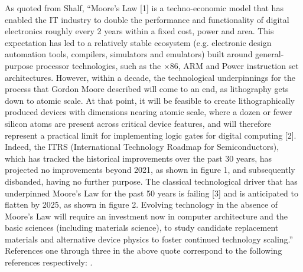\documentclass[]{article}
\begin{document}

As quoted from Shalf\cite{shalf2020future},
``Moore’s Law [1] is a techno-economic model that has enabled the IT industry to double the performance and functionality of digital electronics roughly every 2 years within a fixed cost, power and area. This expectation has led to a relatively stable ecosystem (e.g. electronic design automation tools, compilers, simulators and emulators) built around general-purpose processor technologies, such as the ×86, ARM and Power instruction set architectures. However, within a decade, the technological underpinnings for the process that Gordon Moore described will come to an end, as lithography gets down to atomic scale. At that point, it will be feasible to create lithographically produced devices with dimensions nearing atomic scale, where a dozen or fewer silicon atoms are present across critical device features, and will therefore represent a practical limit for implementing logic gates for digital computing [2]. Indeed, the ITRS (International Technology Roadmap for Semiconductors), which has tracked the historical improvements over the past 30 years, has projected no improvements beyond 2021, as shown in figure 1, and subsequently disbanded, having no further purpose. The classical technological driver that has underpinned Moore’s Law for the past 50 years is failing [3] and is anticipated to flatten by 2025, as shown in figure 2. Evolving technology in the absence of Moore’s Law will require an investment now in computer architecture and the basic sciences (including materials science), to study candidate replacement materials and alternative device physics to foster continued technology scaling.'' References one through three in the above quote 
correspond to the following references respectively: 
\cite{moore2021cramming}\cite{mack2015multiple}\cite{markov2014limits}.
\end{document}
